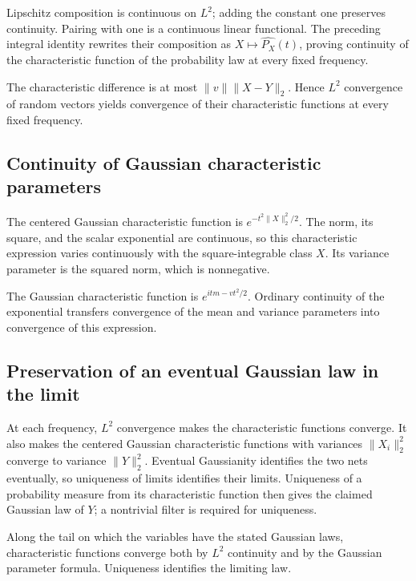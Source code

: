 \documentclass[11pt,a4paper]{article}
\begin{document}
Lipschitz composition is continuous on \(L^2\); adding the constant one preserves continuity. Pairing with one is a continuous linear functional. The preceding integral identity rewrites their composition as \(X\mapsto\widehat{P_X}(t)\), proving continuity of the characteristic function of the probability law at every fixed frequency.



The characteristic difference is at most \(\|v\|\|X-Y\|_2\). Hence \(L^2\) convergence of random vectors yields convergence of their characteristic functions at every fixed frequency.


\subsection{\texorpdfstring{Continuity of Gaussian characteristic parameters}{Continuity of Gaussian characteristic parameters}}


The centered Gaussian characteristic function is \(e^{-t^2\|X\|_2^2/2}\). The norm, its square, and the scalar exponential are continuous, so this characteristic expression varies continuously with the square-integrable class \(X\). Its variance parameter is the squared norm, which is nonnegative.



The Gaussian characteristic function is \(e^{it m-vt^2/2}\). Ordinary continuity of the exponential transfers convergence of the mean and variance parameters into convergence of this expression.


\subsection{\texorpdfstring{Preservation of an eventual Gaussian law in the limit}{Preservation of an eventual Gaussian law in the limit}}


At each frequency, \(L^2\) convergence makes the characteristic functions converge. It also makes the centered Gaussian characteristic functions with variances \(\|X_i\|_2^2\) converge to variance \(\|Y\|_2^2\). Eventual Gaussianity identifies the two nets eventually, so uniqueness of limits identifies their limits. Uniqueness of a probability measure from its characteristic function then gives the claimed Gaussian law of \(Y\); a nontrivial filter is required for uniqueness.



Along the tail on which the variables have the stated Gaussian laws, characteristic functions converge both by \(L^2\) continuity and by the Gaussian parameter formula. Uniqueness identifies the limiting law.
\end{document}
